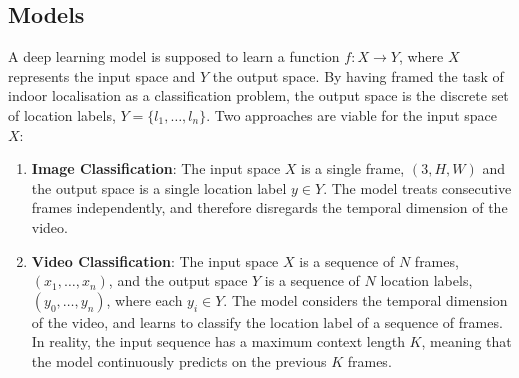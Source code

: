 \documentclass[a4paper]{article}
\begin{document}
  

  \subsection{Models} %
  \label{sub:models}

  A deep learning model is supposed to learn a function $f: X \rightarrow Y$,
  where $X$ represents the input space and $Y$ the output space. By having
  framed the task of indoor localisation as a classification problem, the output
  space is the discrete set of location labels, $Y = \{l_1, \ldots, l_n\}$.
  Two approaches are viable for the input space $X$:

  \begin{enumerate}

    \item \textbf{Image Classification}: The input space $X$ is a single frame,
      $(3, H, W)$ and the output space is a single location label $y \in Y$.
      The model treats consecutive frames independently, and
      therefore disregards the temporal dimension of the video.

    \item \textbf{Video Classification}: The input space $X$ is a sequence of
      $N$ frames, $(x_1, \ldots, x_n)$, and the output space $Y$ is a sequence
      of $N$ location labels, $(y_0, \ldots, y_n)$, where each $y_i \in Y$. The
      model considers the temporal dimension of the video, and learns to
      classify the location label of a sequence of frames. In reality, the input
      sequence has a maximum context length $K$, meaning that the model
      continuously predicts on the previous $K$ frames.

  \end{enumerate}


\end{document}
